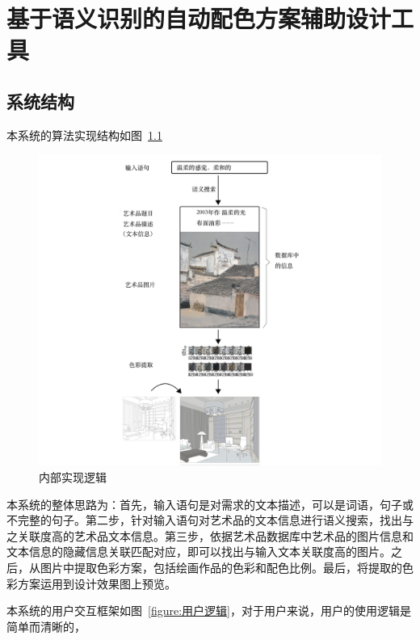 \chapter{基于语义识别的自动配色方案辅助设计工具}

\section{系统结构}

本系统的算法实现结构如图~\ref{figure:内部实现逻辑}

\begin{figure}[!htbp]
\centering
\includegraphics[width=\linewidth,keepaspectratio]{data/chapter-1/系统内部逻辑.jpg}
\caption{内部实现逻辑}
\label{figure:内部实现逻辑}
\end{figure}

本系统的整体思路为：首先，输入语句是对需求的文本描述，可以是词语，句子或不完整的句子。第二步，针对输入语句对艺术品的文本信息进行语义搜索，找出与之关联度高的艺术品文本信息。第三步，依据艺术品数据库中艺术品的图片信息和文本信息的隐藏信息关联匹配对应，即可以找出与输入文本关联度高的图片。之后，从图片中提取色彩方案，包括绘画作品的色彩和配色比例。最后，将提取的色彩方案运用到设计效果图上预览。

本系统的用户交互框架如图~\ref{figure:用户逻辑}，对于用户来说，用户的使用逻辑是简单而清晰的，

